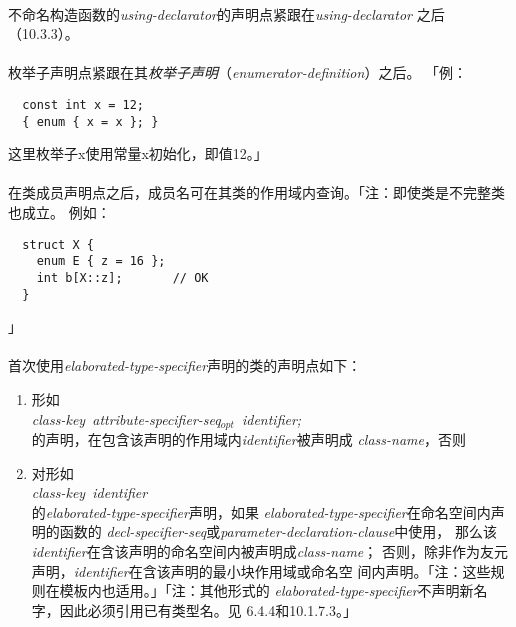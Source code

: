\paragraph{}
不命名构造函数的\textit{using-declarator}的声明点紧跟在\textit{using-declarator}
之后（10.3.3）。

\paragraph{}
枚举子声明点紧跟在其\textit{枚举子声明}（\textit{enumerator-definition}）之后。
「例：
\begin{lstlisting}
  const int x = 12;
  { enum { x = x }; }
\end{lstlisting}
这里枚举子x使用常量x初始化，即值12。」

\paragraph{}
在类成员声明点之后，成员名可在其类的作用域内查询。「注：即使类是不完整类也成立。
例如：
\begin{lstlisting}
  struct X {
    enum E { z = 16 };
    int b[X::z];       // OK
  }
\end{lstlisting}
」

\paragraph{}
首次使用\textit{elaborated-type-specifier}声明的类的声明点如下：
\begin{enumerate}
  \item{形如 \\
    \mbox{\qquad\textit{class-key attribute-specifier-seq$_{opt}$ identifier;}}\\
    的声明，在包含该声明的作用域内\textit{identifier}被声明成
    \textit{class-name}，否则}
  \item{对形如 \\
    \mbox{\qquad\textit{class-key identifier}} \\
    的\textit{elaborated-type-specifier}声明，如果
    \textit{elaborated-type-specifier}在命名空间内声明的函数的
    \textit{decl-specifier-seq}或\textit{parameter-declaration-clause}中使用，
    那么该\textit{identifier}在含该声明的命名空间内被声明成\textit{class-name}；
    否则，除非作为友元声明，\textit{identifier}在含该声明的最小块作用域或命名空
    间内声明。「注：这些规则在模板内也适用。」「注：其他形式的
    \textit{elaborated-type-specifier}不声明新名字，因此必须引用已有类型名。见
    6.4.4和10.1.7.3。」}
\end{enumerate}

